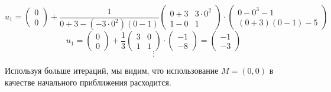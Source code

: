 \documentclass[varwidth,margin=1in]{standalone}
\begin{document}
\[
    u_{1} =
    \left(
    \begin{matrix}
            0 \\
            0
        \end{matrix}
    \right)
    +
    \frac{1}{0+3-(-3 \cdot 0^2)(0-1)}
    \left(
    \begin{matrix}
            0+3 & 3 \cdot 0^2 \\
            1-0 & 1
        \end{matrix}
    \right)
    \cdot
    \left(
    \begin{matrix}
            0-0^3-1 \\
            (0+3)(0-1)-5
        \end{matrix}
    \right)
\]
\[
    u_{1} =
    \left(
    \begin{matrix}
            0 \\
            0
        \end{matrix}
    \right)
    +
    \frac{1}{3}
    \left(
    \begin{matrix}
            3 & 0 \\
            1 & 1
        \end{matrix}
    \right)
    \cdot
    \left(
    \begin{matrix}
            -1 \\
            -8
        \end{matrix}
    \right)
    =
    \left(
    \begin{matrix}
            -1 \\
            -3
        \end{matrix}
    \right)
\]
\[
    \vdots
\]

Используя больше итераций, мы видим, что использование \(M=(0,0)\) в качестве начального приближения расходится.
\end{document}
